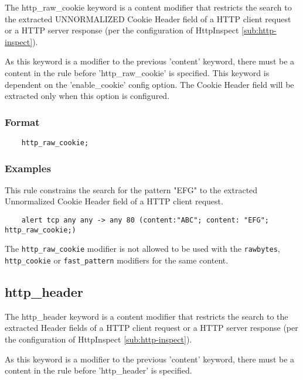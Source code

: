 \documentclass[english]{report}
\newenvironment{note}{
\samepage
    \vspace{10pt}{\textsf{
        {\hspace{7pt}\Huge{$\triangle$\hspace{-12.5pt}{\Large{$^!$}}}}\hspace{5pt}
        {\Large{NOTE}}
    }
    }
   \begin{center}
    \par\vspace{-17pt}

    \begin{lrbox}{\savepar}
    \begin{minipage}[r]{6in}
}
{
    \end{minipage}
    \end{lrbox}
    \fbox{
        \usebox{
            \savepar
	}
    }
    \par\vskip10pt
    \end{center}
}
\newenvironment{note}{
        \begin{rawhtml}
        <p><table border="1"><tr><td><b>
        Note:&nbsp;&nbsp;</b>
        \end{rawhtml}
}{
        \begin{rawhtml}
        </b></td></tr></table></p>
        \end{rawhtml}
}
\begin{document}
The http\_raw\_cookie keyword is a content modifier that restricts the search to the
extracted UNNORMALIZED Cookie Header field of a HTTP client request or a HTTP server 
response (per the configuration of HttpInspect \ref{sub:http-inspect}).

As this keyword is a modifier to the previous 'content' keyword, there must be
a content in the rule before 'http\_raw\_cookie' is specified. This keyword is dependent
on the 'enable\_cookie' config option. The Cookie Header field will be extracted only
when this option is configured.

\subsubsection{Format}

\begin{verbatim}
    http_raw_cookie;
\end{verbatim}

\subsubsection{Examples}

This rule constrains the search for the pattern "EFG" to the extracted Unnormalized
Cookie Header field of a HTTP client request.

\begin{verbatim}
    alert tcp any any -> any 80 (content:"ABC"; content: "EFG"; http_raw_cookie;)
\end{verbatim}

\begin{note}

The \texttt{http\_raw\_cookie} modifier is not allowed to be used with the
\texttt{rawbytes}, \texttt{http\_cookie} or \texttt{fast\_pattern} modifiers for the same 
content.

\end{note}

\subsection{http\_header}
\label{sub:HttpHeader}

The http\_header keyword is a content modifier that restricts the search to the
extracted Header fields of a HTTP client request or a HTTP server response (per the 
configuration of HttpInspect \ref{sub:http-inspect}).

As this keyword is a modifier to the previous 'content' keyword, there must be
a content in the rule before 'http\_header' is specified.
\end{document}
